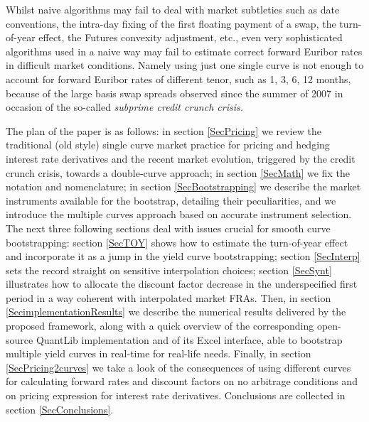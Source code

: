 \documentclass[11pt,reqno]{amsart}
\begin{document}
Whilst naive algorithms may fail to deal with market subtleties such as date conventions, the intra-day fixing of the first floating payment of a swap, the turn-of-year effect, the Futures convexity adjustment, etc., even very sophisticated algorithms used in a naive way may fail to estimate correct forward Euribor rates in difficult market conditions. Namely using just one single curve is not enough to account for forward Euribor rates of different tenor, such as 1, 3, 6, 12 months, because of the large basis swap spreads observed since the summer of 2007 in occasion of the so-called {\it subprime credit crunch crisis.}

The plan of the paper is as follows:
in section \ref{SecPricing} we review the traditional (old style) single curve market practice for pricing and hedging interest rate derivatives and the recent market evolution, triggered by the credit crunch crisis, towards a double-curve approach;
in section \ref{SecMath} we fix the notation and nomenclature;
in section \ref{SecBootstrapping} we describe the market instruments available for the bootstrap, detailing their peculiarities, and we introduce the multiple curves approach based on accurate instrument selection.
The next three following sections deal with issues crucial for smooth curve bootstrapping:
section \ref{SecTOY} shows how to estimate the turn-of-year effect and incorporate it as a jump in the yield curve bootstrapping;
section \ref{SecInterp} sets the record straight on sensitive interpolation choices;
section \ref{SecSynt} illustrates how to allocate the discount factor decrease in the underspecified first period in a way coherent with interpolated market FRAs.
Then, in section \ref{SecimplementationResults} we describe the numerical results delivered by the proposed framework, along with a quick overview of the corresponding open-source QuantLib implementation and of its Excel interface, able to bootstrap multiple yield curves in real-time for real-life needs.
Finally, in section \ref{SecPricing2curves} we take a look of the consequences of using different curves for calculating forward rates and discount factors on no arbitrage conditions and on pricing expression for interest rate derivatives.
Conclusions are collected in section \ref{SecConclusions}.
\end{document}
